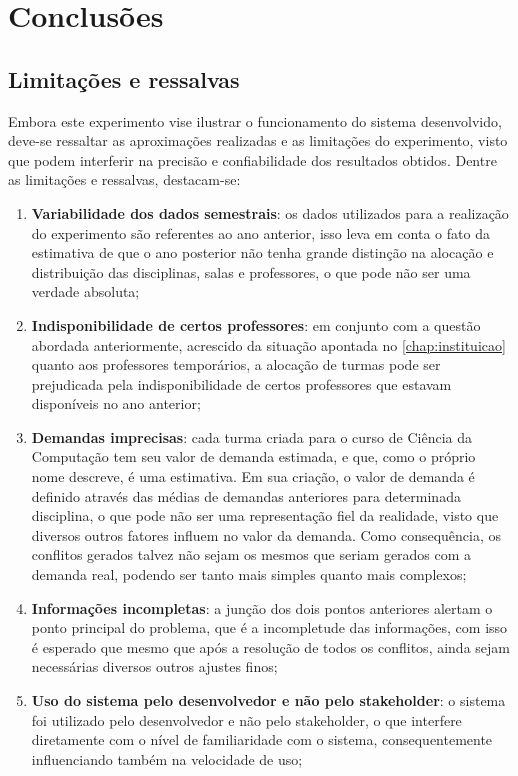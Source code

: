 \section{Conclusões}

\subsection{Limitações e ressalvas}

Embora este experimento vise ilustrar o funcionamento do sistema desenvolvido, deve-se ressaltar as aproximações realizadas e as limitações do experimento, visto que podem interferir na precisão e confiabilidade dos resultados obtidos. Dentre as limitações e ressalvas, destacam-se:

\begin{enumerate}
  \item \textbf{Variabilidade dos dados semestrais}: os dados utilizados para a realização do experimento são referentes ao ano anterior, isso leva em conta o fato da estimativa de que o ano posterior não tenha grande distinção na alocação e distribuição das disciplinas, salas e professores, o que pode não ser uma verdade absoluta;
  \item \textbf{Indisponibilidade de certos professores}: em conjunto com a questão abordada anteriormente, acrescido da situação apontada no \autoref{chap:instituicao} quanto aos professores temporários, a alocação de turmas pode ser prejudicada pela indisponibilidade de certos professores que estavam disponíveis no ano anterior;
  \item \textbf{Demandas imprecisas}: cada turma criada para o curso de Ciência da Computação tem seu valor de demanda estimada, e que, como o próprio nome descreve, é uma estimativa. Em sua criação, o valor de demanda é definido através das médias de demandas anteriores para determinada disciplina, o que pode não ser uma representação fiel da realidade, visto que diversos outros fatores influem no valor da demanda. Como consequência, os conflitos gerados talvez não sejam os mesmos que seriam gerados com a demanda real, podendo ser tanto mais simples quanto mais complexos;
  \item \textbf{Informações incompletas}: a junção dos dois pontos anteriores alertam o ponto principal do problema, que é a incompletude das informações, com isso é esperado que mesmo que após a resolução de todos os conflitos, ainda sejam necessárias diversos outros ajustes finos;
  \item \textbf{Uso do sistema pelo desenvolvedor e não pelo stakeholder}: o sistema foi utilizado pelo desenvolvedor e não pelo stakeholder, o que interfere diretamente com o nível de familiaridade com o sistema, consequentemente influenciando também na velocidade de uso;
\end{enumerate}
